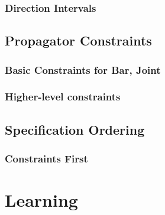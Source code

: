\documentclass[11pt]{article}
\begin{document}
\subsubsection{Direction Intervals}
\label{sec-4-2-2}
\subsection{Propagator Constraints}
\label{sec-4-3}
\subsubsection{Basic Constraints for Bar, Joint}
\label{sec-4-3-1}
\subsubsection{Higher-level constraints}
\label{sec-4-3-2}
\subsection{Specification Ordering}
\label{sec-4-4}
\subsubsection{Constraints First}
\label{sec-4-4-1}
\section{Learning}
\label{sec-5}
\end{document}
